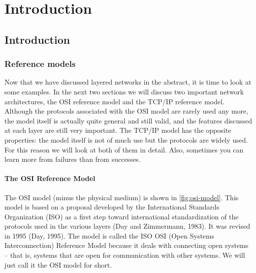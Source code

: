 \documentclass[b5paper,11pt]{memoir}
\begin{document}
\tableofcontents
\clearforchapter\listoffigures


\part{Introduction}


\chapter{Introduction}





\section{Reference models}

Now that we have discussed layered networks in the abstract, it is time to look at some examples.
In the next two sections we will discuss two important network architectures, the OSI reference model and the TCP/IP reference model.
Although the {protocols} associated with the OSI model are rarely used any more, the {model} itself is actually quite general and still valid, and the features discussed at each layer are still very important.
The TCP/IP model has the opposite properties: the model itself is not of much use but the protocols are widely used.
For this reason we will look at both of them in detail. Also, sometimes you can learn more from failures than from successes.

\subsection{The OSI Reference Model}

The OSI model (minus the physical medium) is shown in \cref{fig:osi-model}.
This model is based on a proposal developed by the International Standards Organization (ISO) as a first step toward international standardization of the protocols used in the various layers (Day and Zimmermann, 1983).
It was revised in 1995 (Day, 1995).
The model is called the ISO OSI (Open Systems Interconnection) Reference Model because it deals with connecting open systems -- that is, systems that are open for communication with other systems.
We will just call it the OSI model for short.
\end{document}
